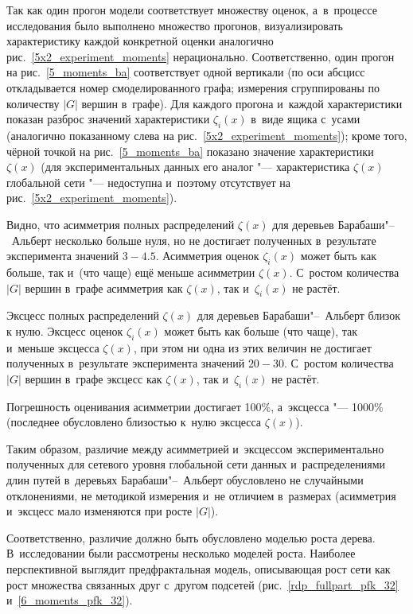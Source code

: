 \documentclass[10pt, a5paper]{article}
\begin{document}
Так как один прогон модели соответствует множеству 
оценок, а~в~процессе исследования было выполнено множество прогонов, визуализировать характеристику каждой конкретной оценки аналогично рис.~\ref{5x2_experiment_moments} нерационально.
Соответственно, один прогон на рис.~\ref{5_moments_ba} соответствует одной вертикали (по оси абсцисс откладывается номер смоделированного графа; измерения сгруппированы по количеству $|G|$ вершин в~графе).
Для каждого прогона и~каждой характеристики показан разброс значений характеристики $\zeta_i(x)$ в~виде ящика с~усами (аналогично показанному слева на рис.~\ref{5x2_experiment_moments});
кроме того, чёрной точкой на рис.~\ref{5_moments_ba} показано значение характеристики $\zeta(x)$ (для экспериментальных данных его аналог "--- характеристика $\zeta(x)$ глобальной сети "--- недоступна и~поэтому отсутствует на рис.~\ref{5x2_experiment_moments}).

Видно, что асимметрия полных распределений $\zeta(x)$ для деревьев Барабаши"--~Альберт несколько больше нуля, но не достигает полученных в~результате эксперимента значений $3-4.5$.
Асимметрия оценок $\zeta_i(x)$ может быть как больше, так и~(что чаще) ещё меньше асимметрии $\zeta(x)$.
С~ростом количества $|G|$ вершин в~графе  асимметрия как $\zeta(x)$, так и~$\zeta_i(x)$ не растёт.

Эксцесс полных распределений $\zeta(x)$ для деревьев Барабаши"--~Альберт близок к нулю.
Эксцесс оценок $\zeta_i(x)$ может быть как больше (что чаще), так и~меньше эксцесса $\zeta(x)$,
при этом ни одна из этих величин не достигает полученных в~результате эксперимента значений $20-30$.
С~ростом количества $|G|$ вершин в~графе  эксцесс как $\zeta(x)$, так и~$\zeta_i(x)$ не растёт.

Погрешность оценивания асимметрии достигает 100\%, а~эксцесса "--- 1000\% (последнее обусловлено близостью к~нулю эксцесса  $\zeta(x)$).


Таким образом, различие между асимметрией и~эксцессом экспериментально полученных для сетевого уровня глобальной сети данных и~распределениями длин путей в~деревьях Барабаши"--~Альберт обусловлено не случайными отклонениями, не методикой измерения
и~не отличием в~размерах (асимметрия и~эксцесс мало изменяются при росте $|G|$).

Соответственно, различие должно быть обусловлено моделью роста дерева.
В~исследовании были рассмотрены несколько моделей роста.
Наиболее перспективной выглядит предфрактальная модель, описывающая рост сети как рост множества связанных друг с~другом подсетей (рис.~\ref{rdp_fullpart_pfk_32} и~\ref{6_moments_pfk_32}).
\end{document}
